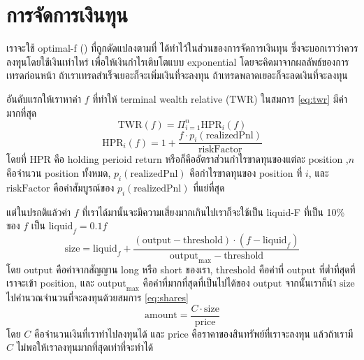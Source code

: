 \section{การจัดการเงินทุน}
เราจะใช้ optimal-f (\cite{Vince}) ที่ถูกดัดแปลงตามที่ \cite{Rodrigo} ได้ทำไว้ในส่วนของการจัดการเงินทุน ซึ่งจะบอกเราว่าควรลงทุุนโดยใช้เงินเท่าไหร่ เพื่อให้เงินกำไรเติบโตแบบ
exponential โดยจะคิดมาจากผลลัพธ์ของการเทรดก่อนหน้า ถ้าเราเทรดสำเร็จเยอะก็จะเพิ่มเงินที่จะลงทุน ถ้าเทรดพลาดเยอะก็จะลดเงินที่จะลงทุน

อันดับแรกให้เราหาค่า $f$ ที่ทำให้ terminal wealth relative ($\text{TWR}$) ในสมการ \ref{eq:twr} มีค่ามากที่สุด
\begin{equation}
    \text{TWR}(f) = \Pi_{i=1}^{n} \text{HPR}_i(f)
    \label{eq:twr}
\end{equation}
\begin{equation}
    \text{HPR}_i(f) = 1 + \frac{f \cdot p_i(\text{realizedPnl})}{\text{riskFactor}}
\end{equation}
โดยที่ $\text{HPR}$ คือ holding perioid return หรือก็คืออัตราส่วนกำไรขาดทุนของแต่ละ position
,$n$ คือจำนวน position ทั้งหมด, $p_i(\text{realizedPnl})$ คือกำไรขาดทุนของ position ที่ $i$,
และ $\text{riskFactor}$ คือค่าสัมบูรณ์ของ $p_i(\text{realizedPnl})$ ที่แย่ที่สุด

แต่ในปรกติแล้วค่า $f$ ที่เราได้มานั้นจะมีความเสี่ยงมากเกินไปเราก็จะใช้เป็น liquid-F ที่เป็น 10\% ของ $f$ เป็น $\text{liquid}_f = 0.1f$
\begin{equation}
    \text{size} = \text{liquid}_f + \frac{(\text{output} - \text{threshold}) \cdot (f - \text{liquid}_f)}{\text{output}_{\text{max}} - \text{threshold}}
\end{equation}
โดย $\text{output}$ คือค่าจากสัญญาน long หรือ short ของเรา, $\text{threshold}$ คือค่าที่ $\text{output}$ ที่ต่ำที่สุดที่เราจะเข้า position, และ
$\text{output}_{\text{max}}$ คือค่าที่มากที่สุดที่เป็นไปได้ของ $\text{output}$ จากนั้นเราก็นำ $\text{size}$ ไปคำนวณจำนวนที่จะลงทุนด้วยสมการ \ref{eq:shares}
\begin{equation}
    \text{amount} = \frac{C \cdot \text{size}}{\text{price}}
    \label{eq:shares}
\end{equation}
โดย $C$ คือจำนวนเงินที่เราทำไปลงทุนได้ และ $\text{price}$ คือราคาของสินทรัพย์ที่เราจะลงทุน แล้วถ้าเรามี $C$ ไม่พอให้เราลงทุนมากที่สุดเท่าที่จะทำได้

